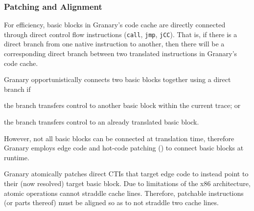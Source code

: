 \documentclass[preprint]{sigplanconf}
\begin{document}






\subsubsection{Patching and Alignment}\label{sec:patching}

For efficiency, basic blocks in Granary's code cache are directly connected through direct control flow instructions (\texttt{call}, \texttt{jmp}, \texttt{jCC}). That is, if there is a direct branch from one native instruction to another, then there will be a corresponding direct branch between two translated instructions in Granary's code cache.

Granary opportunistically connects two basic blocks together using a direct branch if \begin{inparaenum}[i)]
	\item the branch transfers control to another basic block within the current trace; or
	\item the branch transfers control to an already translated basic block.
\end{inparaenum} However, not all basic blocks can be connected at translation time, therefore Granary employs edge code and hot-code patching () to connect basic blocks at runtime.

Granary atomically patches direct CTIs that target edge code to instead point to their (now resolved) target basic block. Due to limitations of the x86 architecture, atomic operations cannot straddle cache lines. Therefore, patchable instructions (or parts thereof) must be aligned so as to not straddle two cache lines.
\end{document}
